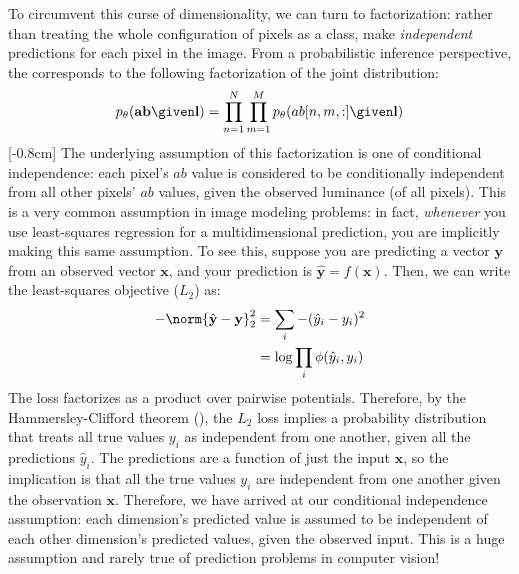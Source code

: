 To circumvent this curse of dimensionality, we can turn to factorization: rather than treating the whole configuration of pixels as a class, make \textit{independent} predictions for each pixel in the image. From a probabilistic inference perspective, the corresponds to the following factorization of the joint distribution:
\begin{align}
    p_{\theta}(\mathbf{ab} \given \mathbf{l}) = \prod_{n=1}^N\prod_{m=1}^M  p_{\theta}(ab[n,m,:] \given \mathbf{l})
\end{align}
[-0.8cm]
The underlying assumption of this factorization is one of conditional independence: each pixel's $ab$ value is considered to be conditionally independent from all other pixels' $ab$ values, given the observed luminance (of all pixels). This is a very common assumption in image modeling problems: in fact, \textit{whenever} you use least-squares regression for a multidimensional prediction, you are implicitly making this same assumption. To see this, suppose you are predicting a vector $\mathbf{y}$ from an observed vector $\mathbf{x}$, and your prediction is $\hat{\mathbf{y}} = f(\mathbf{x})$. Then, we can write the least-squares objective ($L_2$) as:
\begin{align}
    -\norm{\hat{\mathbf{y}} - \mathbf{y}}^2_2 &= \sum_i -(\hat{y}_i - y_i)^2\\
    &= \log \prod_i \phi(\hat{y}_i,y_i)
\end{align}
The loss factorizes as a product over pairwise potentials. Therefore, by the Hammersley-Clifford theorem (\chap{\ref{chapter:probabilistic_graphical_models}}), the $L_2$ loss implies a probability distribution that treats all true values $y_i$ as independent from one another, given all the predictions $\hat{y}_i$. The predictions are a function of just the input $\mathbf{x}$, so the implication is that all the true values $y_i$ are independent from one another given the observation $\mathbf{x}$. Therefore, we have arrived at our conditional independence assumption: each dimension's predicted value is assumed to be independent of each other dimension's predicted values, given the observed input. This is a huge assumption and rarely true of prediction problems in computer vision!

